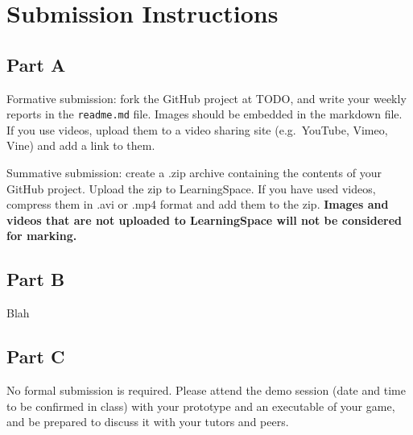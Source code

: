 \documentclass{../fal_assignment}
\begin{document}
\section*{Submission Instructions}

\subsection*{Part A}

Formative submission: fork the GitHub project at TODO, and write your weekly reports in the \texttt{readme.md} file.
Images should be embedded in the markdown file.
If you use videos, upload them to a video sharing site (e.g.\ YouTube, Vimeo, Vine) and add a link to them.

Summative submission: create a .zip archive containing the contents of your GitHub project.
Upload the zip to LearningSpace.
If you have used videos, compress them in .avi or .mp4 format and add them to the zip.
\textbf{Images and videos that are not uploaded to LearningSpace will not be considered for marking.}

\subsection*{Part B}

Blah

\subsection*{Part C}

No formal submission is required.
Please attend the demo session (date and time to be confirmed in class)
with your prototype and an executable of your game,
and be prepared to discuss it with your tutors and peers.
\end{document}
